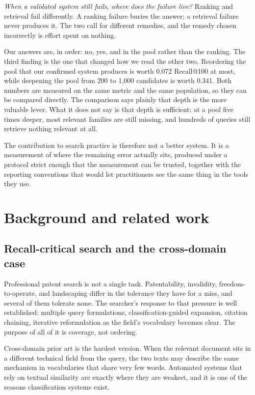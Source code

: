 \documentclass[preprint,11pt,authoryear]{elsarticle}
\begin{document}
\emph{When a validated system still fails, where does the failure live?} Ranking and retrieval fail differently. A ranking failure buries the answer; a retrieval failure never produces it. The two call for different remedies, and the remedy chosen incorrectly is effort spent on nothing.

Our answers are, in order: no, yes, and in the pool rather than the ranking. The third finding is the one that changed how we read the other two. Reordering the pool that our confirmed system produces is worth 0.072 Recall@100 at most, while deepening the pool from 200 to 1{,}000 candidates is worth 0.341. Both numbers are measured on the same metric and the same population, so they can be compared directly. The comparison says plainly that depth is the more valuable lever. What it does not say is that depth is sufficient: at a pool five times deeper, most relevant families are still missing, and hundreds of queries still retrieve nothing relevant at all.

The contribution to search practice is therefore not a better system. It is a measurement of where the remaining error actually sits, produced under a protocol strict enough that the measurement can be trusted, together with the reporting conventions that would let practitioners see the same thing in the tools they use.

\section{Background and related work}
\label{sec:related}

\subsection{Recall-critical search and the cross-domain case}

Professional patent search is not a single task. Patentability, invalidity, freedom-to-operate, and landscaping differ in the tolerance they have for a miss, and several of them tolerate none. The searcher's response to that pressure is well established: multiple query formulations, classification-guided expansion, citation chaining, iterative reformulation as the field's vocabulary becomes clear. The purpose of all of it is coverage, not ordering.

Cross-domain prior art is the hardest version. When the relevant document sits in a different technical field from the query, the two texts may describe the same mechanism in vocabularies that share very few words. Automated systems that rely on textual similarity are exactly where they are weakest, and it is one of the reasons classification systems exist.
\end{document}
